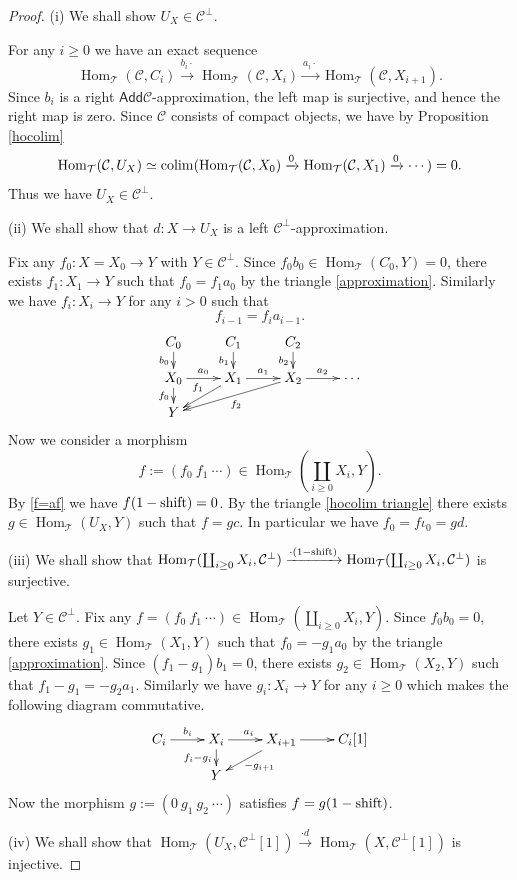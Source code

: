 \documentclass[a4paper,reqno]{amsart}
\theoremstyle{definition}
\newcommand{\CC}{{\mathcal C}}
\newcommand{\TT}{{\mathcal T}}
\newcommand{\Add}{\mathsf{Add}}
\newcommand{\Hom}{\operatorname{Hom}\nolimits}
\begin{document}
\begin{proof}
(i) We shall show $U_X\in\CC^\perp$.

For any $i\ge0$ we have an exact sequence
\[\Hom_{\TT}(\CC,C_i)\xrightarrow{b_i\cdot}\Hom_{\TT}(\CC,X_i)\xrightarrow{a_i\cdot}\Hom_{\TT}(\CC,X_{i+1}).\]
Since $b_i$ is a right $\Add\CC$-approximation, the left map is surjective, and hence the right map is zero.
Since $\CC$ consists of compact objects, we have by Proposition \ref{hocolim}
\[\Hom_{\TT}(\CC,U_X)\simeq{\rm colim}(\Hom_{\TT}(\CC,X_0)\xrightarrow{0}
\Hom_{\TT}(\CC,X_1)\xrightarrow{0}\cdots)=0.\]
Thus we have $U_X\in\CC^\perp$.

(ii) We shall show that $d:X\to U_X$ is a left $\CC^\perp$-approximation.

Fix any $f_0:X=X_0\to Y$ with $Y\in\CC^\perp$.
Since $f_0b_0\in\Hom_{\TT}(C_0,Y)=0$, there exists $f_1:X_1\to Y$ such that $f_0=f_1a_0$
by the triangle \eqref{approximation}.
Similarly we have $f_i:X_i\to Y$ for any $i>0$ such that
\begin{equation}\label{f=af}
f_{i-1}=f_ia_{i-1}.
\end{equation}
\[\xymatrix@R=.4cm{
C_0\ar_{b_0}[d]&C_1\ar_{b_1}[d]&C_2\ar_{b_2}[d]\\
X_0\ar^{a_0}[r]\ar_{f_0}[d]&X_1\ar^{a_1}[r]\ar_{f_1}[ld]&X_2\ar^{a_2}[r]\ar^{f_2}[lld]&\cdots\\
Y
}\]
Now we consider a morphism
\[f:=(f_0\ f_1\ \cdots)\in\Hom_{\TT}(\coprod_{i\ge0}X_i,Y).\]
By \eqref{f=af} we have $f(1-{\rm shift})=0$.
By the triangle \eqref{hocolim triangle} there exists $g\in\Hom_{\TT}(U_X,Y)$
such that $f=gc$.
In particular we have $f_0=f\iota_0=gd$.

(iii) We shall show that
$\Hom_{\TT}(\coprod_{i\ge0}X_i,\CC^\perp)\xrightarrow{\cdot(1-{\rm shift})}
\Hom_{\TT}(\coprod_{i\ge0}X_i,\CC^\perp)$ is surjective.

Let $Y\in\CC^\perp$.
Fix any $f=(f_0\ f_1\ \cdots)\in\Hom_{\TT}(\coprod_{i\ge0}X_i,Y)$.
Since $f_0b_0=0$, there exists $g_1\in\Hom_{\TT}(X_1,Y)$ such that $f_0=-g_1a_0$
by the triangle \eqref{approximation}.
Since $(f_1-g_1)b_1=0$, there exists $g_2\in\Hom_{\TT}(X_2,Y)$ such that
$f_1-g_1=-g_2a_1$.
Similarly we have $g_i:X_i\to Y$ for any $i\ge0$ which makes the following diagram commutative.
\[\xymatrix@R=.4cm{
C_i\ar[r]^{b_i}&X_i\ar[r]^{a_i}\ar[d]_{f_i-g_i}&X_{i+1}\ar[r]\ar[dl]^{-g_{i+1}}&C_i[1]\\
&Y}\]
Now the morphism $g:=(0\ g_1\ g_2\ \cdots)$ satisfies $f=g(1-{\rm shift})$.

(iv) We shall show that
$\Hom_{\TT}(U_X,\CC^\perp[1])\xrightarrow{\cdot d}\Hom_{\TT}(X,\CC^\perp[1])$ is injective.


\end{proof}
\end{document}
